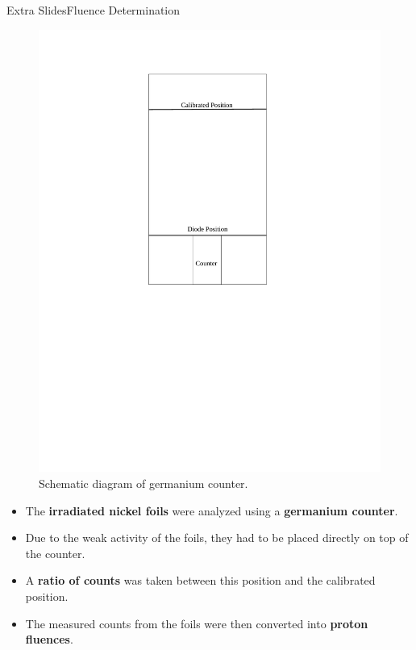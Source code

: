 \documentclass{beamer}
\begin{document}
\begin{frame}{Extra Slides}{Fluence Determination}
        \begin{minipage}{0.45\linewidth}
            \begin{figure}
                \centering
                \includegraphics[width = 0.9\linewidth, trim = {6.5cm 11.5cm 5.5cm 2cm}, clip = true]{Counter.pdf}
                \caption{\footnotesize Schematic diagram of germanium counter.}
            \end{figure}
        \end{minipage}%
        \begin{minipage}{0.55\linewidth}
            \begin{itemize}
                \item The \textbf{irradiated nickel foils} were analyzed using a \textbf{germanium counter}.
                \item Due to the weak activity of the foils, they had to be placed directly on top of the counter.
                \item A \textbf{ratio of counts} was taken between this position and the calibrated position.
                \item The measured counts from the foils were then converted into \textbf{proton fluences}.
            \end{itemize}
        \end{minipage}%
\end{frame}
\end{document}
